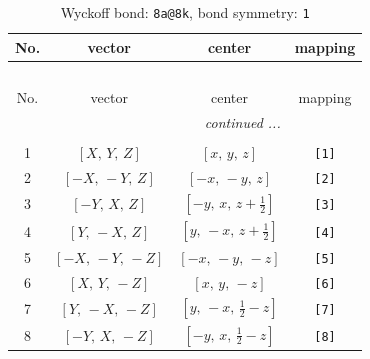 \documentclass[fleqn,8pt]{jsarticle}
\begin{document}
\begin{longtable}{cccc}
\caption{Wyckoff bond: {\tt 8a@8k}, bond symmetry: {\tt 1}}
 \\
 \hline \hline
No. & vector & center & mapping \\ \hline \endfirsthead

\multicolumn{3}{l}{\tablename\ \thetable{}} \\
 \hline \hline
No. & vector & center & mapping \\ \hline \endhead

 \hline \hline
\multicolumn{3}{r}{\footnotesize\it continued ...} \\ \endfoot

 \hline \hline
\multicolumn{3}{r}{} \\ \endlastfoot

1 & $\left[ X,\, Y,\, Z \right]$ & $\left[ x,\, y,\, z \right]$ & {\tt [1]} \\ \hline
2 & $\left[ - X,\, - Y,\, Z \right]$ & $\left[ - x,\, - y,\, z \right]$ & {\tt [2]} \\ \hline
3 & $\left[ - Y,\, X,\, Z \right]$ & $\left[ - y,\, x,\, z + \frac{1}{2} \right]$ & {\tt [3]} \\ \hline
4 & $\left[ Y,\, - X,\, Z \right]$ & $\left[ y,\, - x,\, z + \frac{1}{2} \right]$ & {\tt [4]} \\ \hline
5 & $\left[ - X,\, - Y,\, - Z \right]$ & $\left[ - x,\, - y,\, - z \right]$ & {\tt [5]} \\ \hline
6 & $\left[ X,\, Y,\, - Z \right]$ & $\left[ x,\, y,\, - z \right]$ & {\tt [6]} \\ \hline
7 & $\left[ Y,\, - X,\, - Z \right]$ & $\left[ y,\, - x,\, \frac{1}{2} - z \right]$ & {\tt [7]} \\ \hline
8 & $\left[ - Y,\, X,\, - Z \right]$ & $\left[ - y,\, x,\, \frac{1}{2} - z \right]$ & {\tt [8]} \\
\end{longtable}
\end{document}
